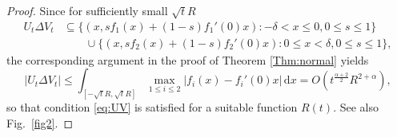 \documentclass[graybox]{svmult}
\newcommand{\ep}{\varepsilon}
\renewcommand{\d}{\mathrm{d}}  %
\renewcommand{\AA}{A}  %
\begin{document}
\begin{proof}
Since  for sufficiently small $\sqrt{t}R$
\begin{align*}
U_t\Delta V_t 
&\subseteq  \{(x, s f_1(x)+(1-s) f_1'(0)x): -\delta < x  \le 0, 0 \le s \le 1 \}  \\ 
&\qquad\cup  \{(x, s f_2(x)+(1-s) f_2'(0)x): 0\le x < \delta,0 \le s \le 1 \}, 
\end{align*}
the corresponding argument in the proof of Theorem \ref{Thm:normal} yields 
\begin{equation} \label{eq:UV2}
|U_t\Delta V_t| \le  \int_{[-\sqrt{t}R, \sqrt{t}R]} \max_{1\le i \le 2}|f_i(x)-f_i'(0)x|\,\d x = O(t^\frac{\alpha+2}{2}R^{2+\alpha}), 
\end{equation}
so that condition \eqref{eq:UV} is satisfied for a suitable function $R(t)$. See also Fig.\ \ref{fig2}. 


\end{proof}
\end{document}
